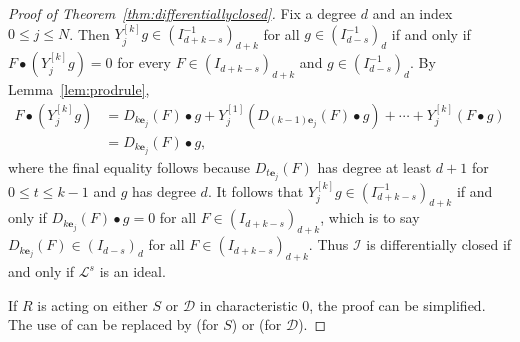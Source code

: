 \documentclass[12pt, reqno]{amsart}
\numberwithin{equation}{section}
\newcommand{\be}{\mathbf{e}}
\newcommand{\N}{{\mathbb N}}
\newcommand{\contract}{\bullet}
\newcommand{\cL}{{\mathcal L}}
\newcommand{\I}{{\mathcal I}}
\theoremstyle{plain} %
\theoremstyle{definition}
\theoremstyle{remark}
\begin{document}
\begin{proof}[Proof of Theorem~\ref{thm:differentiallyclosed}]
Fix a degree $d$ and an index $0\le j\le N$.  Then $Y_j^{[k]}g\in\left(I^{-1}_{d+k-s}\right)_{d+k}$ for all $g\in\left(I^{-1}_{d-s}\right)_d$ if and only if $F\contract(Y^{[k]}_jg)=0$ for every $F\in \left(I_{d+k-s}\right)_{d+k}$ and $g\in\left(I^{-1}_{d-s}\right)_{d}$.  By Lemma~\ref{lem:prodrule},
\[
\begin{array}{rl}
F\contract(Y_j^{[k]}g) & = D_{k\be_j}(F)\contract g + Y_j^{[1]}(D_{(k-1)\be_j}(F)\contract g)+\cdots+Y_j^{[k]}(F\contract g)\\
& =D_{k\be_j}(F)\contract g,
\end{array}
\]
where the final equality follows because $D_{t\be_j}(F)$ has degree at least $d+1$ for $0\le t\le k-1$ and $g$ has degree $d$.  It follows that $Y_j^{[k]}g\in\left(I^{-1}_{d+k-s}\right)_{d+k}$ if and only if $D_{k\be_j}(F)\contract g=0$ for all $F\in \left(I_{d+k-s}\right)_{d+k}$, which is to say $D_{k\be_j}(F)\in (I_{d-s})_d$  for all $F\in \left(I_{d+k-s}\right)_{d+k}$.  Thus $\I$ is differentially closed if and only if $\cL^s$ is an ideal.
%
%
%

If $R$ is acting on either $S$ or $\mathcal{D}$ in characteristic $0$, the proof can be simplified.  The use of  can be replaced by  (for $S$) or  (for $\mathcal{D}$).
\end{proof}
\end{document}
